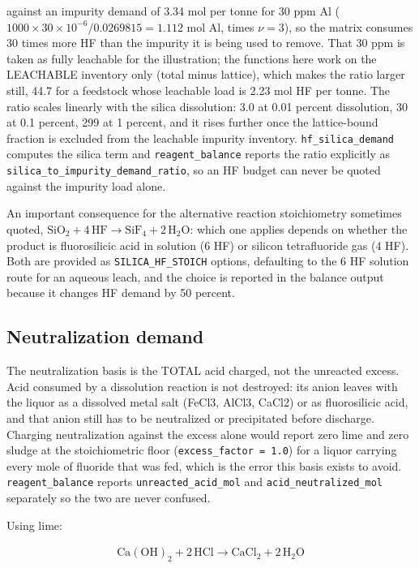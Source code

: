 \documentclass[10pt,a4paper,twoside]{report}
\begin{document}
against an impurity demand of 3.34 mol per tonne for 30 ppm Al ($1000 \times 30\times 10^{-6} / 0.0269815 = 1.112$ mol Al, times $\nu = 3$), so the matrix consumes 30 times more HF than the impurity it is being used to remove. That 30 ppm is taken as fully leachable for the illustration; the functions here work on the LEACHABLE inventory only (total minus lattice), which makes the ratio larger still, 44.7 for a feedstock whose leachable load is 2.23 mol HF per tonne. The ratio scales linearly with the silica dissolution: 3.0 at 0.01 percent dissolution, 30 at 0.1 percent, 299 at 1 percent, and it rises further once the lattice-bound fraction is excluded from the leachable impurity inventory. \texttt{hf\_silica\_demand} computes the silica term and \texttt{reagent\_balance} reports the ratio explicitly as \texttt{silica\_to\_impurity\_demand\_ratio}, so an HF budget can never be quoted against the impurity load alone.

An important consequence for the alternative reaction stoichiometry sometimes quoted, $\mathrm{SiO_2} + 4\,\mathrm{HF} \rightarrow \mathrm{SiF_4} + 2\,\mathrm{H_2O}$: which one applies depends on whether the product is fluorosilicic acid in solution (6 HF) or silicon tetrafluoride gas (4 HF). Both are provided as \texttt{SILICA\_HF\_STOICH} options, defaulting to the 6 HF solution route for an aqueous leach, and the choice is reported in the balance output because it changes HF demand by 50 percent.

\subsection*{Neutralization demand}

The neutralization basis is the TOTAL acid charged, not the unreacted excess. Acid consumed by a dissolution reaction is not destroyed: its anion leaves with the liquor as a dissolved metal salt (FeCl3, AlCl3, CaCl2) or as fluorosilicic acid, and that anion still has to be neutralized or precipitated before discharge. Charging neutralization against the excess alone would report zero lime and zero sludge at the stoichiometric floor (\texttt{excess\_factor = 1.0}) for a liquor carrying every mole of fluoride that was fed, which is the error this basis exists to avoid. \texttt{reagent\_balance} reports \texttt{unreacted\_acid\_mol} and \texttt{acid\_neutralized\_mol} separately so the two are never confused.

Using lime:

\begin{equation*}
\begin{gathered}
\mathrm{Ca(OH)_2} + 2\,\mathrm{HCl} \rightarrow \mathrm{CaCl_2} + 2\,\mathrm{H_2O}
\end{gathered}
\end{equation*}
\end{document}
